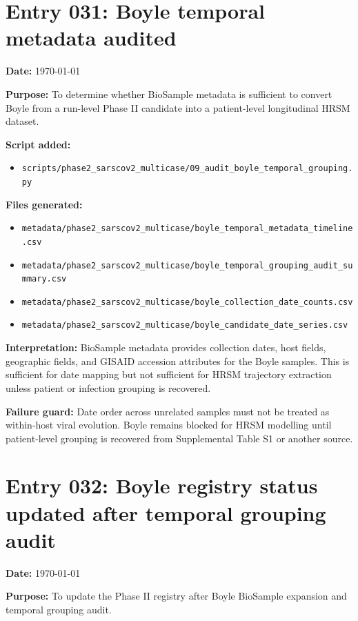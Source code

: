 \section*{Entry 031: Boyle temporal metadata audited}

\textbf{Date:} \today

\textbf{Purpose:} To determine whether BioSample metadata is sufficient to convert Boyle from a run-level Phase II candidate into a patient-level longitudinal HRSM dataset.

\textbf{Script added:}
\begin{itemize}
    \item \texttt{scripts/phase2\_sarscov2\_multicase/09\_audit\_boyle\_temporal\_grouping.py}
\end{itemize}

\textbf{Files generated:}
\begin{itemize}
    \item \texttt{metadata/phase2\_sarscov2\_multicase/boyle\_temporal\_metadata\_timeline.csv}
    \item \texttt{metadata/phase2\_sarscov2\_multicase/boyle\_temporal\_grouping\_audit\_summary.csv}
    \item \texttt{metadata/phase2\_sarscov2\_multicase/boyle\_collection\_date\_counts.csv}
    \item \texttt{metadata/phase2\_sarscov2\_multicase/boyle\_candidate\_date\_series.csv}
\end{itemize}

\textbf{Interpretation:} BioSample metadata provides collection dates, host fields, geographic fields, and GISAID accession attributes for the Boyle samples. This is sufficient for date mapping but not sufficient for HRSM trajectory extraction unless patient or infection grouping is recovered.

\textbf{Failure guard:} Date order across unrelated samples must not be treated as within-host viral evolution. Boyle remains blocked for HRSM modelling until patient-level grouping is recovered from Supplemental Table S1 or another source.


\section*{Entry 032: Boyle registry status updated after temporal grouping audit}

\textbf{Date:} \today

\textbf{Purpose:} To update the Phase II registry after Boyle BioSample expansion and temporal grouping audit.

